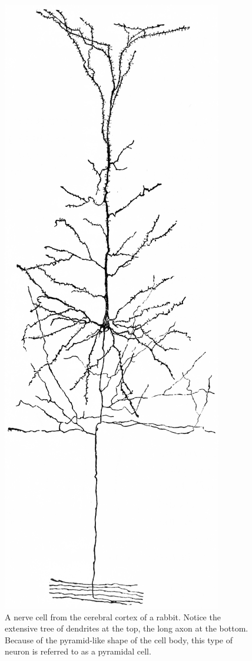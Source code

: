 \begin{figure}

{\centering \includegraphics[width=0.7\linewidth]{./figures/cells/RabbitPyramidalCellCajalMetodos} 

}

\caption{A nerve cell from the cerebral cortex of a rabbit. Notice the extensive tree of dendrites at the top, the long axon at the bottom. Because of the pyramid-like shape of the cell body, this type of neuron is referred to as a pyramidal cell.}\label{fig:pyramidalcell}
\end{figure}

